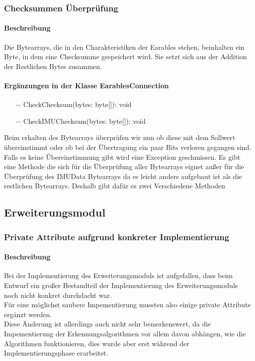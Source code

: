\documentclass[a4paper,12pt]{article}
\begin{document}
\subsubsection{Checksummen Überprüfung}
\paragraph{Beschreibung}
Die Bytearrays, die in den Charakteristiken der Earables stehen, beinhalten ein Byte, in dem eine Checksumme gespeichert wird. Sie setzt sich aus der Addition der Restlichen Bytes zusammen. 

\paragraph{Ergänzungen in der Klasse EarablesConnection}
\begin{itemize}
	\item[$-$] CheckChecksum(bytes: byte[]): void
	\item[$-$] CheckIMUChecksum(bytes: byte[]): void
\end{itemize}
Beim erhalten des Bytearrays überprüfen wir nun ob diese mit dem Sollwert übereinstimmt oder ob bei der Übertragung ein paar Bits verloren gegangen sind. Falls es keine Übereinstimmung gibt wird eine Exception geschmissen. Es gibt eine Methode die sich für die Überprüfung aller Bytearrays eignet außer für die Überprüfung des IMUData Bytearrays da es leicht anders aufgebaut ist als die restlichen Bytearrays. Deshalb gibt dafür es zwei Verschiedene Methoden

\subsection{Erweiterungsmodul}


\subsubsection{Private Attribute aufgrund konkreter Implementierung}
\paragraph{Beschreibung}
Bei der Implementierung des Erweiterungsmoduls ist aufgefallen, dass beim Entwurf ein großer Bestandteil der Implementierung des Erweiterungsmoduls noch nicht konkret durchdacht war.\\
Für eine möglichst saubere Impementierung mussten also einige private Attribute ergänzt werden.\\ 
Diese Änderung ist allerdings auch nicht sehr bemerkenswert, da die Impementierung der Erkennungsalgorithmen vor allem davon abhängen, wie die Algorithmen funktionieren, dies wurde aber erst während der Implementierungsphase erarbeitet. \\
\end{document}
